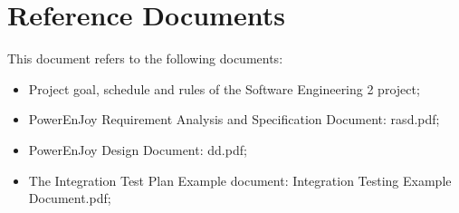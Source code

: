 \section{Reference Documents}
This document refers to the following documents:
\begin{itemize}
\item Project goal, schedule and rules of the Software Engineering 2 project;
\item PowerEnJoy Requirement Analysis and Specification Document: rasd.pdf;
\item PowerEnJoy Design Document: dd.pdf;
\item The Integration Test Plan Example document: Integration Testing Example Document.pdf;
\end{itemize}